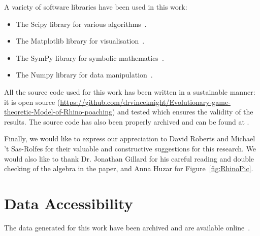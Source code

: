 \documentclass[10pt]{article}
\begin{document}
A variety of software libraries have been used in this work:

\begin{itemize}
    \item The Scipy library for various algorithms~\cite{scipy}.
    \item The Matplotlib library for visualisation~\cite{hunter2007matplotlib}.
    \item The SymPy library for symbolic mathematics~\cite{sympy}.
    \item The Numpy library for data manipulation~\cite{walt2011numpy}.
\end{itemize}

All the source code used for this work has been written in a sustainable manner: it is
open source (\url{https://github.com/drvinceknight/Evolutionary-game-theoretic-Model-of-Rhino-poaching})
and tested which ensures the validity of the results. The source code
has also been properly archived and can be found at \cite{Evorepo2018}.

Finally, we would like to express our appreciation to David Roberts and Michael 't
Sas-Rolfes for their valuable and constructive suggestions for this research.
We would also like to thank
Dr. Jonathan Gillard for his careful reading and double checking of the algebra in the paper,
and Anna Huzar for Figure~\ref{fig:RhinoPic}.

\section*{Data Accessibility}

The data generated for this work have been archived and are available
online~\cite{Glynatsi2017}.



\end{document}
